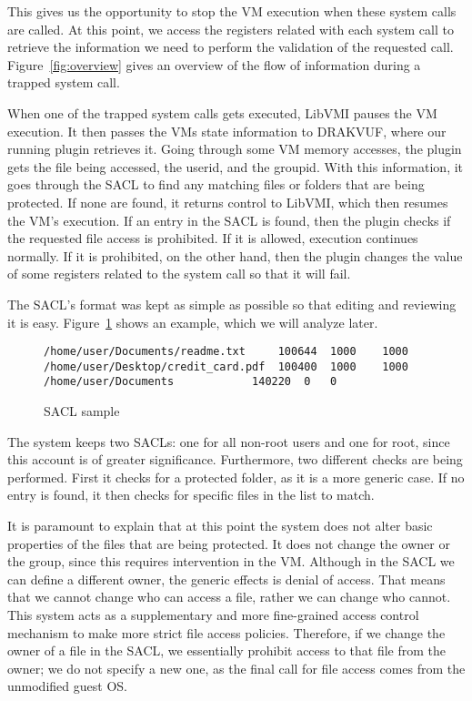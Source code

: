 This gives us the opportunity to stop the \ac{VM} execution when these system calls are called. At this point, we access the registers related with each system call to retrieve the information we need to perform the validation of the requested call. Figure~\ref{fig:overview} gives an overview of the flow of information during a trapped system call. 

\par When one of the trapped system calls gets executed, LibVMI pauses the \ac{VM} execution. It then passes the \ac{VM}s state information to DRAKVUF, where our running plugin retrieves it. Going through some \ac{VM} memory accesses, the plugin gets the file being accessed, the userid, and the groupid. With this information, it goes through the \ac{SACL} to find any matching files or folders that are being protected. If none are found, it returns control to LibVMI, which then resumes the \ac{VM}'s execution. If an entry in the \ac{SACL} is found, then the plugin checks if the requested file access is prohibited. If it is allowed, execution continues normally. If it is prohibited, on the other hand, then the plugin changes the value of some registers related to the system call so that it will fail.

\par The \ac{SACL}'s format was kept as simple as possible so that editing and reviewing it is easy. Figure~\ref{fig:sacl} shows an example, which we will analyze later.

\begin{figure}[ht]
	\centering
	\begin{lstlisting}
/home/user/Documents/readme.txt		100644	1000	1000
/home/user/Desktop/credit_card.pdf	100400	1000	1000
/home/user/Documents			140220	0	0
	\end{lstlisting}
	\caption{\ac{SACL} sample}
	\label{fig:sacl}
\end{figure}

\par The system keeps two \ac{SACL}s: one for all non-root users and one for root, since this account is of greater significance. Furthermore, two different checks are being performed. First it checks for a protected folder, as it is a more generic case. If no entry is found, it then checks for specific files in the list to match.

\par It is paramount to explain that at this point the system does not alter basic properties of the files that are being protected. It does not change the owner or the group, since this requires intervention in the \ac{VM}. Although in the \ac{SACL} we can define a different owner, the generic effects is denial of access. That means that we cannot change who can access a file, rather we can change who cannot. This system acts as a supplementary and more fine-grained access control mechanism to make more strict file access policies. Therefore, if we change the owner of a file in the \ac{SACL}, we essentially prohibit access to that file from the owner; we do not specify a new one, as the final call for file access comes from the unmodified guest \ac{OS}.

